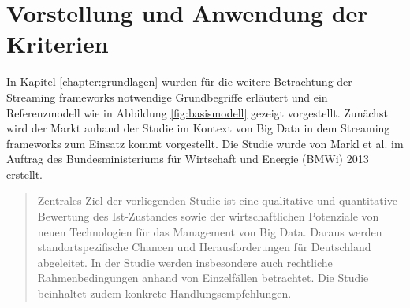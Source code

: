 \chapter{Vorstellung und Anwendung der Kriterien}
\label{chapter:kriterien}

In Kapitel \ref{chapter:grundlagen} wurden für die weitere Betrachtung der Streaming frameworks notwendige Grundbegriffe erläutert und ein Referenzmodell wie in Abbildung \ref{fig:basismodell} gezeigt vorgestellt. Zunächst wird der Markt anhand der Studie  im Kontext von Big Data in dem Streaming frameworks zum Einsatz kommt vorgestellt. Die Studie  wurde von Markl et al. im Auftrag des Bundesministeriums für Wirtschaft und Energie (BMWi) 2013 erstellt. 

\begin{quote}
Zentrales Ziel der vorliegenden Studie ist eine qualitative und quantitative Bewertung des Ist-Zustandes sowie der wirtschaftlichen Potenziale von neuen Technologien für das Management von Big Data. Daraus werden standortspezifische Chancen und Herausforderungen für Deutschland abgeleitet. In der Studie werden insbesondere auch rechtliche Rahmenbedingungen anhand von Einzelfällen betrachtet. Die Studie beinhaltet zudem konkrete Handlungsempfehlungen. 
\end{quote}

